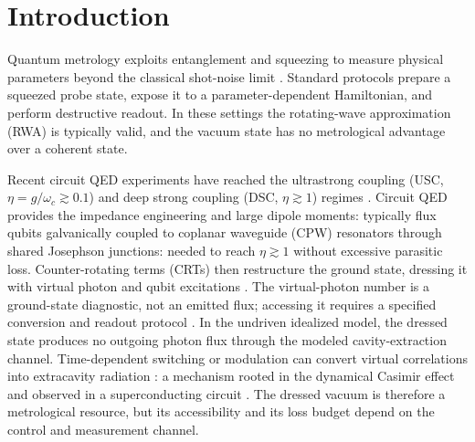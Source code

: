 \documentclass[aps,prxquantum,preprint,superscriptaddress,amsmath,amssymb]{revtex4-2}
\begin{document}
\section{Introduction}
\label{sec:intro}

Quantum metrology exploits entanglement and squeezing to measure physical parameters beyond the classical shot-noise limit \cite{Caves1981,Giovannetti2004,Giovannetti2011,Paris2009,Pezze2018,BraunsteinCaves1994}. Standard protocols prepare a squeezed probe state, expose it to a parameter-dependent Hamiltonian, and perform destructive readout. In these settings the rotating-wave approximation (RWA) is typically valid, and the vacuum state has no metrological advantage over a coherent state.

Recent circuit QED experiments have reached the ultrastrong coupling (USC, $\eta = g/\omega_c \gtrsim \num{0.1}$) and deep strong coupling (DSC, $\eta \gtrsim \num{1}$) regimes \cite{Ciuti2005,Kockum2019,Kockum2014,FornDiaz2017,FornDiaz2019,Niemczyk2010,Yoshihara2017,YouNori2011,Girvin2019Schr}. Circuit QED provides the impedance engineering and large dipole moments: typically flux qubits galvanically coupled to coplanar waveguide (CPW) resonators through shared Josephson junctions: needed to reach $\eta \gtrsim \num{1}$ without excessive parasitic loss. Counter-rotating terms (CRTs) then restructure the ground state, dressing it with virtual photon and qubit excitations \cite{DeLiberato2017,Bertet2014Expe,Didier2015,Kockum2019}. The virtual-photon number is a ground-state diagnostic, not an emitted flux; accessing it requires a specified conversion and readout protocol \cite{DeLiberato2017,Giannelli2024}. In the undriven idealized model, the dressed state produces no outgoing photon flux through the modeled cavity-extraction channel. Time-dependent switching or modulation can convert virtual correlations into extracavity radiation \cite{Stassi2013,Garziano2013}: a mechanism rooted in the dynamical Casimir effect \cite{Nation2012} and observed in a superconducting circuit \cite{Wilson2011}. The dressed vacuum is therefore a metrological resource, but its accessibility and its loss budget depend on the control and measurement channel.
\end{document}
